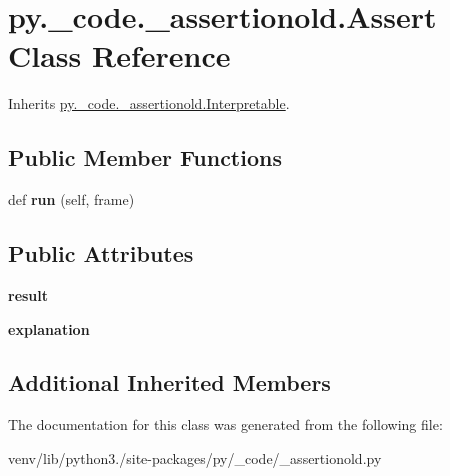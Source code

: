 \hypertarget{classpy_1_1__code_1_1__assertionold_1_1_assert}{}\section{py.\+\_\+code.\+\_\+assertionold.\+Assert Class Reference}
\label{classpy_1_1__code_1_1__assertionold_1_1_assert}


Inherits \hyperlink{classpy_1_1__code_1_1__assertionold_1_1_interpretable}{py.\+\_\+code.\+\_\+assertionold.\+Interpretable}.

\subsection*{Public Member Functions}
\begin{DoxyCompactItemize}
\item 
\mbox{\label{classpy_1_1__code_1_1__assertionold_1_1_assert_a28cec4d3d0e210768e3fd51e092c079f}} 
def {\bfseries run} (self, frame)
\end{DoxyCompactItemize}
\subsection*{Public Attributes}
\begin{DoxyCompactItemize}
\item 
\mbox{\label{classpy_1_1__code_1_1__assertionold_1_1_assert_a898ceb518ec413b054a8e8d6c9a4f04b}} 
{\bfseries result}
\item 
\mbox{\label{classpy_1_1__code_1_1__assertionold_1_1_assert_ab28bf9cf849e811cc21f6ea9a6c60544}} 
{\bfseries explanation}
\end{DoxyCompactItemize}
\subsection*{Additional Inherited Members}


The documentation for this class was generated from the following file\+:\begin{DoxyCompactItemize}
\item 
venv/lib/python3./site-\/packages/py/\+\_\+code/\+\_\+assertionold.\+py\end{DoxyCompactItemize}
